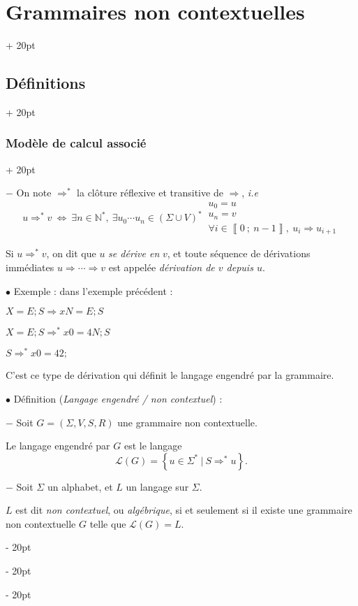\documentclass[a4paper, 12pt, twoside]{article}
\newcommand{\N}{\mathbb{N}} %
\newcommand{\nset}[2]{\left\llbracket #1\ ;\ #2 \right\rrbracket}
\newcommand{\lr}[1]{\left( #1 \right)}
\newcommand{\set}[1]{\left\{ #1 \right\}}
\newcommand{\ssi}{\ \Leftrightarrow \ }
\newcommand{\ind}[1][20pt]{\advance\leftskip + #1}
\newcommand{\deind}[1][20pt]{\advance\leftskip - #1}
\newenvironment{indt}[2][20pt]{#2 \par \ind[#1]}{\par \deind} %
\begin{document}
\begin{indt}{\section{Grammaires non contextuelles}}
\begin{indt}{\subsection{Définitions}}
\begin{indt}{\subsubsection{Modèle de calcul associé}}
                \vspace{6pt}
                
                $-$ On note $\Rightarrow^*$ la clôture réflexive et transitive de $\Rightarrow$, \textit{i.e}
                \[
                    u \Rightarrow^* v
                    \ssi
                    \exists n \in \N^*,\ \exists u_0 \cdots u_n \in \lr{\Sigma \cup V}^*\
                    \begin{array}{|l}
                        u_0 = u
                        \\
                        u_n = v
                        \\
                        \forall i \in \nset 0 {n - 1},\ u_i \Rightarrow u_{i + 1}
                    \end{array}
                \]

                Si $u \Rightarrow^* v$, on dit que $u$ \emph{se dérive en} $v$, et toute séquence de dérivations immédiates $u \Rightarrow \cdots \Rightarrow v$ est appelée \emph{dérivation de $v$ depuis $u$}.

                \vspace{12pt}
                
                $\bullet$ Exemple : dans l'exemple précédent :

                $X = E; S \Rightarrow xN = E; S$

                $X = E; S \Rightarrow^* x0 = 4N; S$

                $S \Rightarrow^* x0 = 42;$

                C'est ce type de dérivation qui définit le langage engendré par la grammaire.

                \vspace{12pt}
                
                $\bullet$ Définition (\textit{Langage engendré / non contextuel}) :

                $-$ Soit $G = \lr{\Sigma, V, S, R}$ une grammaire non contextuelle.

                Le langage engendré par $G$ est le langage
                \[
                    \mathcal L(G) = \set{u \in \Sigma^*\ |\ S \Rightarrow^* u}.
                \]

                $-$ Soit $\Sigma$ un alphabet, et $L$ un langage sur $\Sigma$.

                $L$ est dit \emph{non contextuel}, ou \emph{algébrique}, si et seulement si il existe une grammaire non contextuelle $G$ telle que $\mathcal L(G) = L$.
            \end{indt}


\end{indt}
\end{indt}
\end{document}
